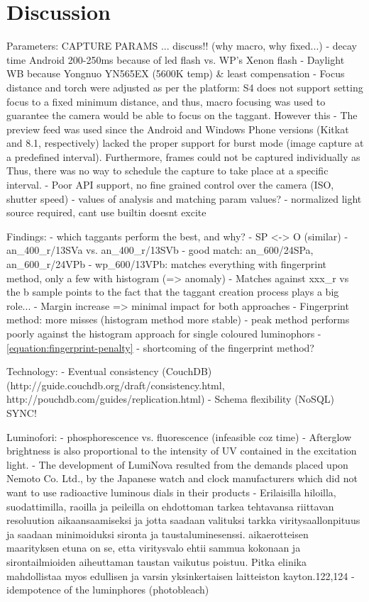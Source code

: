 \documentclass[thesis.tex]{subfiles}
\begin{document}
\chapter{Discussion}
\label{chapter:discussion}

Parameters:
CAPTURE PARAMS ... discuss!! (why macro, why fixed...)
- decay time Android 200-250ms because of led flash vs. WP's Xenon flash
- Daylight WB because Yongnuo YN565EX (5600K temp) \& least compensation
- Focus distance and torch were adjusted as per the platform: S4 does not support setting focus to a fixed minimum distance, and thus, macro focusing was used to guarantee the camera would be able to focus on the taggant. However this
- The preview feed was used since the Android and Windows Phone versions (Kitkat and 8.1, respectively) lacked the proper support for burst mode (image capture at a predefined interval). Furthermore, frames could not be captured individually as Thus, there was no way to schedule the capture to take place at a specific interval.
- Poor API support, no fine grained control over the camera (ISO, shutter speed)
- values of analysis and matching param values?
- normalized light source required, cant use builtin doesnt excite

Findings:
- which taggants perform the best, and why?
- SP <-> O (similar)
- an\_400\_r/13SVa vs. an\_400\_r/13SVb
- good match: an\_600/24SPa, an\_600\_r/24VPb
- wp\_600/13VPb: matches everything with fingerprint method, only a few with histogram (=> anomaly)
- Matches against xxx\_r vs the b sample points to the fact that the taggant creation process plays a big role...
- Margin increase => minimal impact for both approaches
- Fingerprint method: more misses (histogram method more stable)
- peak method performs poorly against the histogram approach for single coloured luminophors
- \ref{equation:fingerprint-penalty} - shortcoming of the fingerprint method?

Technology:
- Eventual consistency (CouchDB) (http://guide.couchdb.org/draft/consistency.html, http://pouchdb.com/guides/replication.html)
- Schema flexibility (NoSQL) SYNC!

Luminofori:
- phosphorescence vs. fluorescence (infeasible coz time)
- Afterglow brightness is also proportional to the intensity of UV contained in the excitation light.
- The development of LumiNova resulted from the demands placed upon Nemoto  Co. Ltd.,  by the Japanese watch and clock manufacturers which did not want to use radioactive luminous dials in their products
- Erilaisilla hiloilla, suodattimilla, raoilla ja peileilla on ehdottoman tarkea tehtavansa riittavan resoluution aikaansaamiseksi ja jotta saadaan valituksi tarkka viritysaallonpituus ja saadaan minimoiduksi sironta ja taustaluminesenssi. aikaerotteisen maarityksen etuna on se, etta viritysvalo ehtii sammua kokonaan ja sirontailmioiden aiheuttaman taustan vaikutus poistuu. Pitka elinika mahdollistaa myos edullisen ja varsin yksinkertaisen laitteiston kayton.122,124
- idempotence of the luminphores (photobleach)
\end{document}

